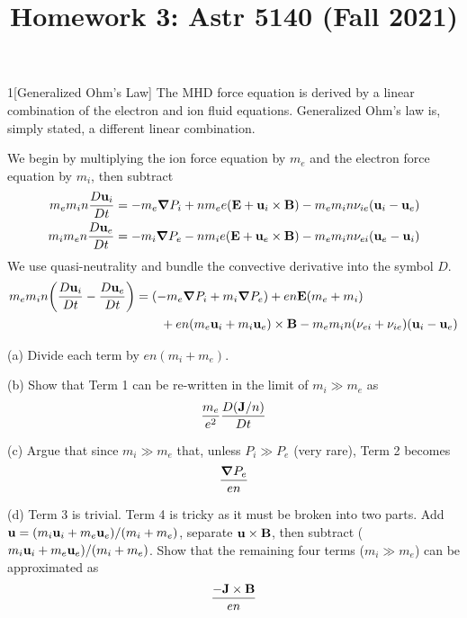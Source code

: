 \documentclass[12pt]{article}
\title{Homework 3: Astr 5140 (Fall 2021)}
\begin{document}
\maketitle
\begin{problem}{1}[Generalized Ohm's Law]
The MHD force equation is derived by a linear combination of the electron and
ion fluid equations. Generalized Ohm's law is, simply stated, a different linear
combination.

We begin by multiplying the ion force equation by $m_e$ and the electron force
equation by $m_i$, then subtract
\begin{subequations}
    \begin{align}
        m_em_in\frac{D\vb{u}_i}{D t}
        &=-m_e\grad P_i+nm_ee(\vb{E}+\vb{u}_i\times\vb{B})
            -m_em_in\nu_{ie}(\vb{u}_i-\vb{u}_e)\\
        m_im_en\frac{D\vb{u}_e}{D t}
        &=-m_i\grad P_e-nm_ie(\vb{E}+\vb{u}_e\times\vb{B})
            -m_em_in\nu_{ei}(\vb{u}_e-\vb{u}_i)
    \end{align}
\end{subequations}
We use quasi-neutrality and bundle the convective derivative into the symbol
$D$.
\begin{align}
    m_em_in\qty(\frac{D\vb{u}_i}{Dt}-\frac{D\vb{u}_e}{Dt})
    &=\qty(-m_e\grad P_i+m_i\grad P_e)
    +en\vb{E}(m_e+m_i)\notag\\
    &\qquad+en\qty(m_e\vb{u}_i+m_i\vb{u}_e)\times\vb{B}
    -m_em_in(\nu_{ei}+\nu_{ie})(\vb{u}_i-\vb{u}_e)
\end{align}

(a) Divide each term by $en(m_i+m_e)$.

(b) Show that Term 1 can be re-written in the limit of $m_i\gg m_e$ as
\begin{equation}
    \frac{m_e}{e^2}\frac{D(\vb{J}/n)}{Dt} 
\end{equation}

(c) Argue that since $m_i\gg m_e$ that, unless $P_i\gg P_e$ (very rare), Term 2
becomes
\begin{equation}
    \frac{\grad P_e}{en} 
\end{equation}

(d) Term 3 is trivial. Term 4 is tricky as it must be broken into two parts. Add
$\vb{u}=(m_i\vb{u}_i+m_e\vb{u}_e) /(m_i+m_e)$, separate $\vb{u}\times\vb{B}$,
then subtract ($m_i\vb{u}_i+m_e\vb{u}_e) /(m_i+m_e)$. Show that the remaining
four terms ($m_i\gg m_e$) can be approximated as
\begin{equation}
    \frac{-\vb{J}\times\vb{B}}{en} 
\end{equation}


\end{problem}
\end{document}

